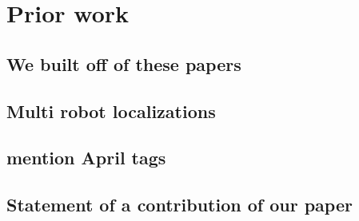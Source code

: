 \section{Prior work}
\subsection{We built off of these papers}
\subsection{Multi robot localizations}
\subsection{mention April tags}
\subsection{Statement of a contribution of our paper} 